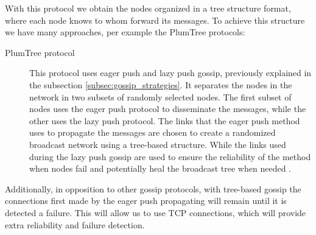 With this protocol we obtain the nodes organized in a tree structure format, where each node
knows to whom forward its messages. To achieve this structure we have many approaches,
per example the PlumTree protocols:
\begin{description}
    \item[PlumTree protocol] This protocol uses eager push and lazy push gossip, previously
        explained in the subsection \ref{subsec:gossip_strategies}. It separates the nodes in the
        network in two subsets of randomly selected nodes. The first subset of nodes uses the
        eager push protocol to disseminate the messages, while the other uses the lazy push
        protocol. The links that the eager push method uses to propagate the messages are
        chosen to create a randomized broadcast network using a tree-based structure. While
        the links used during the lazy push gossip are used to ensure the reliability of the
        method when nodes fail and potentially heal the broadcast tree when needed \cite{Leitao2007Tree}.
\end{description}

Additionally, in opposition to other gossip protocols, with tree-based gossip the connections
first made by the eager push propagating will remain until it is detected a failure. This will
allow us to use TCP connections, which will provide extra reliability and failure detection.


